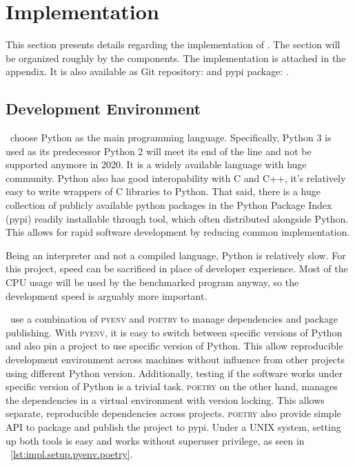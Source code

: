 \section{Implementation}
\label{sec:impl.impl}

This section presents details regarding the implementation of \OurBenchmarkingTool.
The section will be organized roughly by the components.
The implementation is attached in the appendix.
It is also available as Git repository: \href{https://github.com/rkkautsar/reprobench}{} and pypi package: \href{https://pypi.org/project/reprobench/}{}.

\subsection{Development Environment}

\First~choose Python as the main programming language.
Specifically, Python 3 is used as its predecessor Python 2 will meet its end of the line and not be supported anymore in 2020.
It is a widely available language with huge community.
Python also has good interopability with C and C++, it's relatively easy to write wrappers of C libraries to Python.
That said, there is a huge collection of publicly available python packages in the Python Package Index (pypi) readily installable through  tool, which often distributed alongside Python.
This allows for rapid software development by reducing common implementation.

Being an interpreter and not a compiled language, Python is relatively slow.
For this project, speed can be sacrificed in place of developer experience.
Most of the CPU usage will be used by the benchmarked program anyway, so the development speed is arguably more important.

\First~use a combination of \textsc{pyenv} and \textsc{poetry} to manage dependencies and package publishing.
With \textsc{pyenv}, it is easy to switch between specific versions of Python and also pin a project to use specific version of Python.
This allow reproducible development environment across machines without influence from other projects using different Python version.
Additionally, testing if the software works under specific version of Python is a trivial task.
\textsc{poetry} on the other hand, manages the dependencies in a virtual environment with version locking.
This allows separate, reproducible dependencies across projects.
\textsc{poetry} also provide simple API to package and publish the project to pypi.
Under a UNIX system, setting up both tools is easy and works without superuser privilege, as seen in \lst~\ref{lst:impl.setup.pyenv.poetry}.

